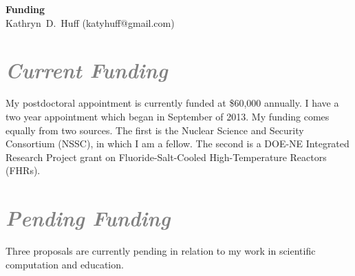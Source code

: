 \documentclass[a4paper, 10pt]{article}
\makeatletter
\newcommand{\authorname}{Kathryn~D.~Huff }
\newcommand{\authoremail}{katyhuff@gmail.com}
\newcommand{\authorsite}{katyhuff.github.com}
\makeatother
\begin{document}
\pagestyle{fancy}
\lhead{\textcolor{gray}{\it \authorname}}
\rhead{\textcolor{gray}{\thepage/\totalpages{}}}
\renewcommand{\headrulewidth}{0pt} 
\renewcommand{\footrulewidth}{0pt} 
\fancyfoot[C]{\footnotesize \textcolor{gray}{\authorsite}} 

\begin{center}
{\LARGE \bf Funding}\\
\vspace*{0.1cm}
{\normalsize \authorname (\authoremail)}
\end{center}






\section*{\textcolor{gray}{\it Current Funding}}
My postdoctoral appointment is currently funded at \$60,000 annually. I have a 
two year appointment which began in September of 2013.  My funding comes equally 
from two sources. The first is the Nuclear Science and Security Consortium 
(NSSC), in which I am a fellow. The second is a DOE-NE Integrated Research 
Project grant on Fluoride-Salt-Cooled High-Temperature Reactors (FHRs).  

\section*{\textcolor{gray}{\it Pending Funding}}
Three proposals are currently pending in relation to my work in scientific 
computation and education.
\end{document}
